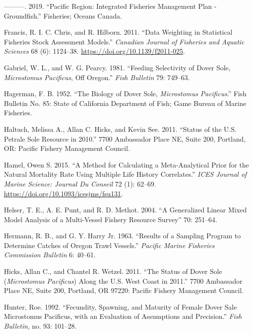 \documentclass[11pt,
  english,
  a4paper,
]{article}
\begin{document}
\begin{cslreferences}
\leavevmode\hypertarget{ref-department_of_fisheries_and_ocean_pacific_2019}{}%
---------. 2019. ``Pacific Region: Integrated Fisheries Management Plan - Groundfish.'' Fisheries; Oceans Canada.

\leavevmode\hypertarget{ref-francis_data_2011}{}%
Francis, R. I. C. Chris, and R. Hilborn. 2011. ``Data Weighting in Statistical Fisheries Stock Assessment Models.'' \emph{Canadian Journal of Fisheries and Aquatic Sciences} 68 (6): 1124--38. \url{https://doi.org/10.1139/f2011-025}.

\leavevmode\hypertarget{ref-gabriel_feeding_1981}{}%
Gabriel, W. L., and W. G. Pearcy. 1981. ``Feeding Selectivity of Dover Sole, \emph{Microstomus Pacificus}, Off Oregon.'' \emph{Fish Bulletin} 79: 749--63.

\leavevmode\hypertarget{ref-hagerman_biology_1952}{}%
Hagerman, F. B. 1952. ``The Biology of Dover Sole, \emph{Microstomus Pacificus}.'' Fish Bulletin No. 85: State of California Department of Fish; Game Bureau of Marine Fisheries.

\leavevmode\hypertarget{ref-haltuch_status_2011}{}%
Haltuch, Melissa A., Allan C. Hicks, and Kevin See. 2011. ``Status of the U.S. Petrale Sole Resource in 2010.'' 7700 Ambassador Place NE, Suite 200, Portland, OR: Pacific Fishery Management Council.

\leavevmode\hypertarget{ref-hamel_method_2015}{}%
Hamel, Owen S. 2015. ``A Method for Calculating a Meta-Analytical Prior for the Natural Mortality Rate Using Multiple Life History Correlates.'' \emph{ICES Journal of Marine Science: Journal Du Conseil} 72 (1): 62--69. \url{https://doi.org/10.1093/icesjms/fsu131}.

\leavevmode\hypertarget{ref-helser_generalized_2004}{}%
Helser, T. E., A. E. Punt, and R. D. Methot. 2004. ``A Generalized Linear Mixed Model Analysis of a Multi-Vessel Fishery Resource Survey'' 70: 251--64.

\leavevmode\hypertarget{ref-hermann_results_1963}{}%
Hermann, R. B., and G. Y. Harry Jr. 1963. ``Results of a Sampling Program to Determine Catches of Oregon Trawl Vessels.'' \emph{Pacific Marine Fisheries Commission Bulletin} 6: 40--61.

\leavevmode\hypertarget{ref-hicks_status_2011}{}%
Hicks, Allan C., and Chantel R. Wetzel. 2011. ``The Status of Dover Sole (\emph{Microstomus Pacificus}) Along the U.S. West Coast in 2011.'' 7700 Ambassador Place NE, Suite 200, Portland, OR 97220: Pacific Fishery Management Council.

\leavevmode\hypertarget{ref-hunter_fecundity_1992}{}%
Hunter, Roe. 1992. ``Fecundity, Spawning, and Maturity of Female Dover Sale Microstomus Pacificus, with an Evaluation of Assumptions and Precision.'' \emph{Fish Bulletin}, no. 93: 101--28.


\end{cslreferences}
\end{document}
